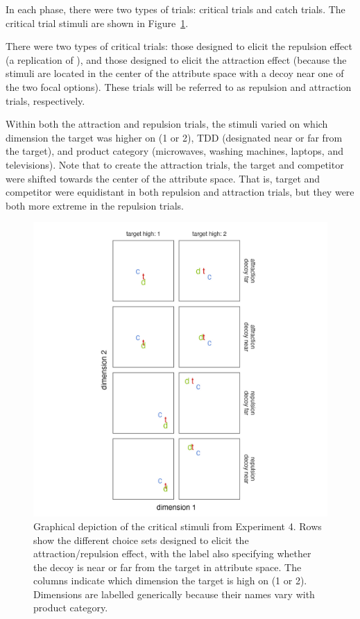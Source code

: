 In each phase, there were two types of trials: critical trials and catch trials. The critical trial stimuli are shown in Figure~\ref{fig:ce_rating_stim}. 

There were two types of critical trials: those designed to elicit the repulsion effect (a replication of \citeauthor{banerjeeFactorsThatPromote2024}), and those designed to elicit the attraction effect (because the stimuli are located in the center of the attribute space with a decoy near one of the two focal options). These trials will be referred to as repulsion and attraction trials, respectively.

Within both the attraction and repulsion trials, the stimuli varied on which dimension the target was higher on (1 or 2), TDD (designated near or far from the target), and product category (microwaves, washing machines, laptops, and televisions). Note that to create the attraction trials, the target and competitor were shifted towards the center of the attribute space. That is, target and competitor were equidistant in both repulsion and attraction trials, but they were both more extreme in the repulsion trials.

\begin{figure}
    \centering
    \includegraphics[scale=0.25]{figures/ce_rating_stim_for_paper.jpeg}
    \caption{Graphical depiction of the critical stimuli from Experiment 4. Rows show the different choice sets designed to elicit the attraction/repulsion effect, with the label also specifying whether the decoy is near or far from the target in attribute space. The columns indicate which dimension the target is high on (1 or 2). Dimensions are labelled generically because their names vary with product category.}
    \label{fig:ce_rating_stim}
\end{figure}

